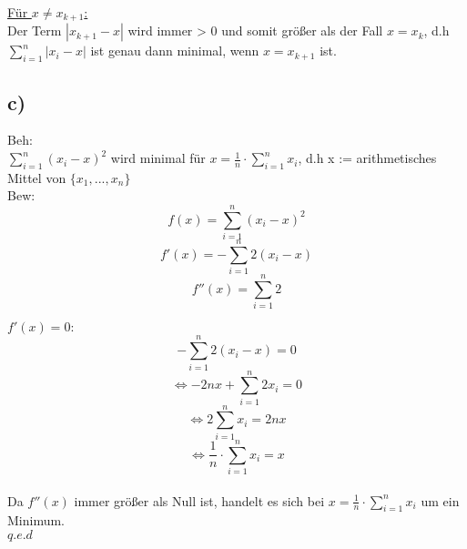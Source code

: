 \documentclass[a4paper,11pt,twoside]{article}
\begin{document}
\underline{Für $x \neq x_{k+1}$:}\\
Der Term  $|x_{k+1}-x|$ wird immer > 0 und somit größer als der Fall $x=x_k$, d.h  $\sum_{i=1}^{n} |x_i-x|$ ist genau dann minimal, wenn $x = x_{k+1}$ ist.

\subsection*{c)}

Beh:\\ $\sum_{i=1}^{n} (x_i-x)^2$ wird minimal für $x = \frac{1}{n} \cdot \sum_{i=1}^{n}x_i$, d.h x := arithmetisches Mittel von $\{x_1, ..., x_n\}$\\

Bew: \\
\[f(x) = \sum_{i=1}^{n} (x_i -x)^2\]
\[f'(x) = -\sum_{i=1}^{n} 2(x_i -x)\]
\[f''(x) = \sum_{i=1}^{n} 2\]

\underline{$f'(x)=0:$}\\
\[-\sum_{i=1}^{n}2(x_i -x) = 0\]
\[\Leftrightarrow -2nx + \sum_{i=1}^{n}2x_i = 0\]
\[\Leftrightarrow 2\sum_{i=1}^{n}x_i = 2nx\]
\[\Leftrightarrow \frac{1}{n} \cdot \sum_{i=1}^{n}x_i = x\]\\

Da $f''(x)$ immer größer als Null ist, handelt es sich bei $x = \frac{1}{n} \cdot \sum_{i=1}^{n}x_i$ um ein Minimum.\\
$q.e.d$
\end{document}
